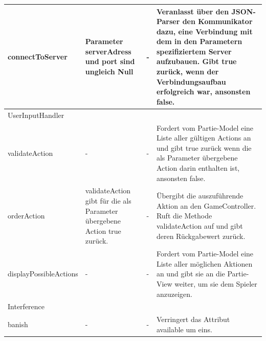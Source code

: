 \begin{center}
	\begin{tabular}{|p{4.7cm}|p{3.5cm}|p{3.5cm}|p{4.3cm}|}	
		\hline
		connectToServer & Parameter serverAdress und port sind ungleich Null & - & Veranlasst über den JSON-Parser den Kommunikator dazu, eine Verbindung mit dem in den Parametern spezifiziertem Server aufzubauen. Gibt true zurück, wenn der Verbindungsaufbau erfolgreich war, ansonsten false.\\\hline
		\multicolumn{4}{|l|}{UserInputHandler} \\\hline
		validateAction & - & - & Fordert vom Partie-Model eine Liste aller gültigen Actions an und gibt true zurück wenn die als Parameter übergebene Action darin enthalten ist, ansonsten false.\\\hline
		orderAction & validateAction gibt für die als Parameter übergebene Action true zurück. & - & Übergibt die auszuführende Aktion an den GameController. Ruft die Methode validateAction auf und gibt deren Rückgabewert zurück.\\\hline
		displayPossibleActions & - & - & Fordert vom Partie-Model eine Liste aller möglichen Aktionen an und gibt sie an die Partie-View weiter, um sie dem Spieler anzuzeigen.\\\hline
		\multicolumn{4}{|l|}{Interference} \\\hline
		banish & - & - & Verringert das Attribut available um eins.\\\hline
		
	\end{tabular}
\end{center}


